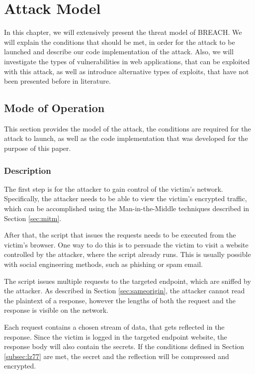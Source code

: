 \chapter{Attack Model}\label{ch:attack}

In this chapter, we will extensively present the threat model of BREACH. We will
explain the conditions that should be met, in order for the attack to be
launched and describe our code implementation of the attack. Also, we will
investigate the types of vulnerabilities in web applications, that can be
exploited with this attack, as well as introduce alternative types of exploits,
that have not been presented before in literature.

\section{Mode of Operation}\label{sec:mo}

This section provides the model of the attack, the conditions are required for
the attack to launch, as well as the code implementation that was developed for
the purpose of this paper.

\subsection{Description}

The first step is for the attacker to gain control of the victim's network.
Specifically, the attacker needs to be able to view the victim's encrypted
traffic, which can be accomplished using the Man-in-the-Middle techniques
described in Section \ref{sec:mitm}.

After that, the script that issues the requests needs to be executed from the
victim's browser. One way to do this is to persuade the victim to visit a
website controlled by the attacker, where the script already runs. This is
usually possible with social engineering methods, such as phishing or spam
email.

The script issues multiple requests to the targeted endpoint, which are sniffed
by the attacker. As described in Section \ref{sec:sameorigin}, the attacker
cannot read the plaintext of a response, however the lengths of both the request
and the response is visible on the network.

Each request contains a chosen stream of data, that gets reflected in the
response. Since the victim is logged in the targeted endpoint website, the
response body will also contain the secrets. If the conditions defined in
Section \ref{subsec:lz77} are met, the secret and the reflection will be
compressed and encrypted.


